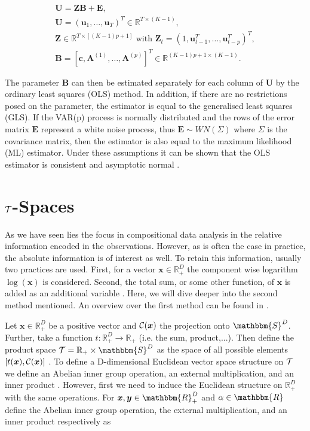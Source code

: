 \begin{gather*}
\textbf{U} = \textbf{ZB} + \textbf{E}, \\
\textbf{U} = (\textbf{u}_1,\ldots,\textbf{u}_T)^T \in \mathbb{R}^{T \times (K-1)}, \\
\textbf{Z} \in \mathbb{R}^{T \times \left[(K-1)p+1\right]} \text{ with } \textbf{Z}_t = \left(1,\textbf{u}_{t-1}^T,\ldots,\textbf{u}_{t-p}^T\right)^T, \\ %
\textbf{B} = \left[\textbf{c},\textbf{A}^{(1)}, \ldots, \textbf{A}^{(p)}\right]^T \in \mathbb{R}^{(K-1)p +1 \times (K-1)}.
\label{eq:VAR model matrix}
\end{gather*}


The parameter $\textbf{B}$ can then be estimated separately for each column of $\textbf{U}$ by the ordinary least squares (OLS) method. In addition, if there are no restrictions posed on the parameter, the estimator is equal to the generalised least squares (GLS). If the VAR(p) process is normally distributed and the rows of the error matrix $\textbf{E}$ represent a white noise process, thus $\bm{E} \sim WN(\Sigma)$ where $\Sigma$ is the covariance matrix, then the estimator is also equal to the maximum likelihood (ML) estimator. 
Under these assumptions it can be shown that the OLS estimator is consistent and asymptotic normal \cite{Kynclova:2015} \cite{Luetkepohl:2007}. 


\section{$\mathcal{T}$-Spaces}
\label{sec: Tspaces}

As we have seen lies the focus in compositional data analysis in the relative information encoded in the observations. However, as is often the case in practice, the absolute information is of interest as well. To retain this information, usually two practices are used. First, for a vector $\bm{x} \in \mathbb{R}^D_+$ the component wise logarithm $\log(\bm{x})$ is considered. Second, the total sum, or some other function, of $\bm{x}$ is added as an additional variable \cite{Pawlowsky:2013}. Here, we will dive deeper into the second method mentioned. An overview over the first method can be found in \cite{Pawlowsky:2013}. 

Let $\bm{x} \in \mathbb{R}^D_+$ be a positive vector and $\mathcal{C}(\bm{x})$ the projection onto $\mathbbm{S}^D$. Further, take a function $t:\mathbb{R}^D_+ \longrightarrow \mathbb{R}_+$ (i.e. the sum, product,...). Then define the product space  $\Tsp = \mathbb{R}_+ \times \mathbbm{S}^D$ as the space of all possible elements $[t(\bm{x}),\mathcal{C}(\bm{x})]$ \cite{Pawlowsky:2013}. To define a D-dimensional Euclidean vector space structure on $\mathcal{T}$ we define an Abelian inner group operation, an external multiplication, and an inner product \cite{Pawlowsky:2013}. However, first we need to induce the Euclidean structure on $\mathbb{R}_+^D$ with the same operations. For $\bm{x},\bm{y} \in \mathbbm{R}_+^D$ and $\alpha \in \mathbbm{R}$ define the Abelian inner group operation, the external multiplication, and an inner product respectively as \cite{Pawlowsky:2013}

